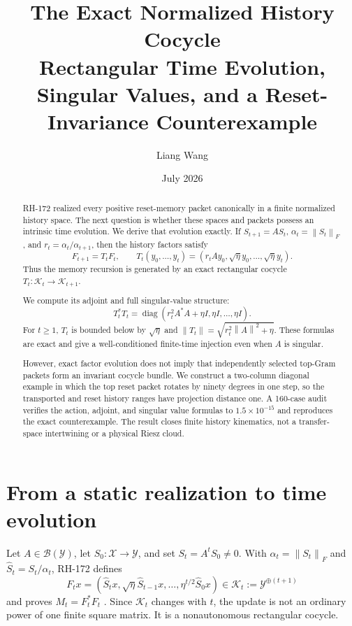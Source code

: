 \documentclass[12pt]{article}
\title{The Exact Normalized History Cocycle\\
\large Rectangular Time Evolution, Singular Values, and a Reset-Invariance Counterexample}
\author{Liang Wang}
\date{July 2026}
\theoremstyle{definition}
\theoremstyle{remark}
\newcommand{\cX}{\mathcal X}
\newcommand{\cY}{\mathcal Y}
\newcommand{\cK}{\mathcal K}
\newcommand{\norm}[1]{\left\lVert#1\right\rVert}
\begin{document}
\maketitle

\begin{abstract}
RH-172 realized every positive reset-memory packet canonically in a finite
normalized history space.  The next question is whether these spaces and
packets possess an intrinsic time evolution.  We derive that evolution
exactly.  If $S_{t+1}=AS_t$, $\alpha_t=\norm{S_t}_F$, and
$r_t=\alpha_t/\alpha_{t+1}$, then the history factors satisfy
\[
 F_{t+1}=T_tF_t,
 \qquad
 T_t(y_0,\ldots,y_t)=
 (r_tAy_0,\sqrt\eta y_0,\ldots,\sqrt\eta y_t).
\]
Thus the memory recursion is generated by an exact rectangular cocycle
$T_t:\cK_t\to\cK_{t+1}$.

We compute its adjoint and full singular-value structure:
\[
 T_t^*T_t=
 \operatorname{diag}(r_t^2A^*A+\eta I,\eta I,\ldots,\eta I).
\]
For $t\ge1$, $T_t$ is bounded below by $\sqrt\eta$ and
$\norm{T_t}=\sqrt{r_t^2\norm A^2+\eta}$.  These formulas are exact and give a
well-conditioned finite-time injection even when $A$ is singular.

However, exact factor evolution does not imply that independently selected
top-Gram packets form an invariant cocycle bundle.  We construct a two-column
diagonal example in which the top reset packet rotates by ninety degrees in
one step, so the transported and reset history ranges have projection
distance one.  A 160-case audit verifies the action, adjoint, and singular
value formulas to $1.5\times10^{-15}$ and reproduces the exact counterexample.
The result closes finite history kinematics, not a transfer-space
intertwining or a physical Riesz cloud.
\end{abstract}

\section{From a static realization to time evolution}

Let $A\in\mathcal B(\cY)$, let $S_0:\cX\to\cY$, and set
$S_t=A^tS_0\ne0$.  With $\alpha_t=\norm{S_t}_F$ and
$\widehat S_t=S_t/\alpha_t$, RH-172 defines
\[
 F_tx=(\widehat S_tx,\sqrt\eta\widehat S_{t-1}x,
 \ldots,\eta^{t/2}\widehat S_0x)
 \in\cK_t:=\cY^{\oplus(t+1)}
\]
and proves $M_t=F_t^*F_t$ \citep{WangRH172}.  Since $\cK_t$ changes with
$t$, the update is not an ordinary power of one finite square matrix.  It is
a nonautonomous rectangular cocycle.
\end{document}
